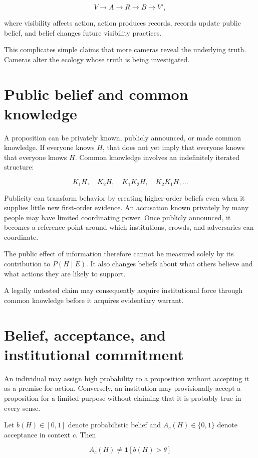 \[
V\to A\to R\to B\to V',
\]

where visibility affects action, action produces records, records update public belief, and belief changes future visibility practices.

This complicates simple claims that more cameras reveal the underlying truth. Cameras alter the ecology whose truth is being investigated.

\section{Public belief and common knowledge}
\label{sec:a52}

A proposition can be privately known, publicly announced, or made common knowledge. If everyone knows \(H\), that does not yet imply that everyone knows that everyone knows \(H\). Common knowledge involves an indefinitely iterated structure:

\[
K_1H,\quad K_2H,\quad K_1K_2H,\quad K_2K_1H,\ldots
\]

Publicity can transform behavior by creating higher-order beliefs even when it supplies little new first-order evidence. An accusation known privately by many people may have limited coordinating power. Once publicly announced, it becomes a reference point around which institutions, crowds, and adversaries can coordinate.

The public effect of information therefore cannot be measured solely by its contribution to \(P(H\mid E)\). It also changes beliefs about what others believe and what actions they are likely to support.

A legally untested claim may consequently acquire institutional force through common knowledge before it acquires evidentiary warrant.

\section{Belief, acceptance, and institutional commitment}
\label{sec:a53}

An individual may assign high probability to a proposition without accepting it as a premise for action. Conversely, an institution may provisionally accept a proposition for a limited purpose without claiming that it is probably true in every sense.

Let \(b(H)\in[0,1]\) denote probabilistic belief and \(A_c(H)\in\{0,1\}\) denote acceptance in context \(c\). Then

\[
A_c(H)
\neq
\mathbf 1[b(H)>\theta]
\]

